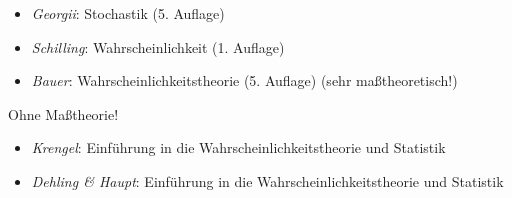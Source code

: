 \begin{itemize}
	\item \textit{Georgii}: Stochastik (5. Auflage)
	\item \textit{Schilling}: Wahrscheinlichkeit (1. Auflage)
	\item \textit{Bauer}: Wahrscheinlichkeitstheorie (5. Auflage) (sehr maßtheoretisch!)
\end{itemize}
Ohne Maßtheorie!
\begin{itemize}
	\item \textit{Krengel}: Einführung in die Wahrscheinlichkeitstheorie und Statistik
	\item \textit{Dehling \& Haupt}: Einführung in die Wahrscheinlichkeitstheorie und Statistik
\end{itemize}